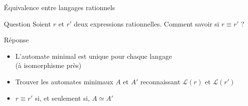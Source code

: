 
\begingroup

\begin{frame}{Équivalence entre langages rationnels}

  \begin{alertblock}{Question}
    Soient $r$ et $r'$ deux expressions rationnelles.
    Comment savoir si $r \equiv r'$ ? 
  \end{alertblock}
  
  \begin{block}{Réponse}
    \begin{itemize}
    \item L'automate minimal est unique pour chaque langage \\(à isomorphisme près)
    \item Trouver les automates minimaux $A$ et $A'$ reconnaissant $\mathcal{L}(r)$ et $\mathcal{L}(r')$ 
    \item $r \equiv r'$ si, et seulement si, $A \simeq A'$
    \end{itemize}
  \end{block}

\end{frame}

\endgroup
